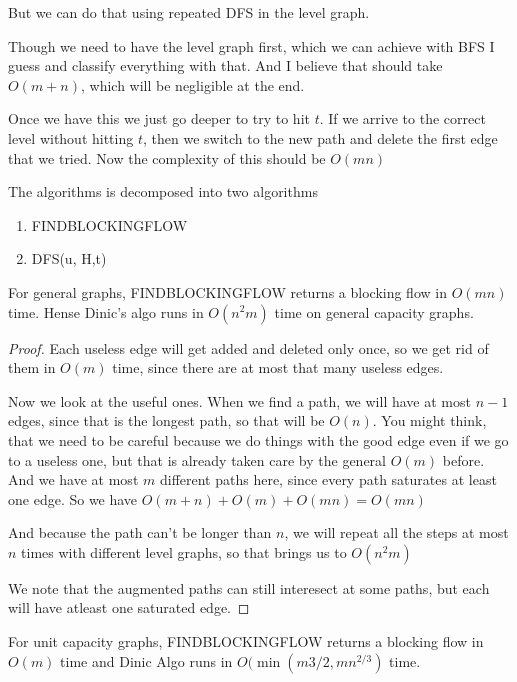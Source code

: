 But we can do that using repeated DFS in the level graph.

Though we need to have the level graph first, which we can achieve with BFS I guess and classify everything with that. And I believe that should take $O(m+n)$, which will be negligible at the end.

Once we have this we just go deeper to try to hit $t$. If we arrive to the correct level without hitting $t$, then we switch to the new path and delete the first edge that we tried. Now the complexity of this should be $O(mn)$

The algorithms is decomposed into two algorithms

\begin{enumerate}
    \item FINDBLOCKINGFLOW
    \item DFS(u, H,t)
\end{enumerate}



\begin{lema}
    For general graphs, FINDBLOCKINGFLOW returns a blocking flow in $O(mn)$ time. Hense Dinic's algo runs in $O(n^2m)$ time on general capacity graphs.
\end{lema}

\begin{proof}
    Each useless edge will get added and deleted only once, so we get rid of them in $O(m)$ time, since there are at most that many useless edges.

    Now we look at the useful ones. When we find a path, we will have at most $n-1$ edges, since that is the longest path, so that will be $O(n)$. You might think, that we need to be careful because we do things with the good edge even if we go to a useless one, but that is already taken care by the general $O(m)$ before. And we have at most $m$ different paths here, since every path saturates at least one edge. So we have $O(m+n) + O(m) + O(mn) = O(mn)$

    And because the path can't be longer than $n$, we will repeat all the steps at most $n$ times with different level graphs, so that brings us to $O(n^2m)$

    We note that the augmented paths can still interesect at some paths, but each will have atleast one saturated edge.
\end{proof}

\begin{lema}
    For unit capacity graphs, FINDBLOCKINGFLOW returns a blocking flow in $O(m)$ time and Dinic Algo runs in $O(\min (m{3/2}, mn^{2/3})$ time.
\end{lema}

